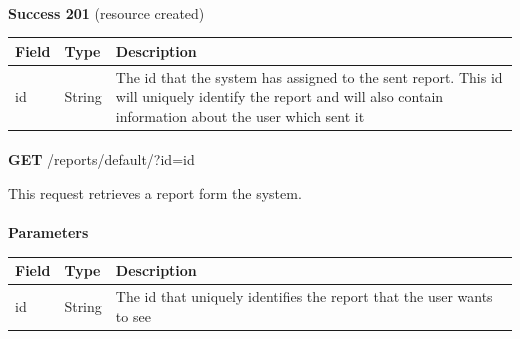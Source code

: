 						\paragraph{}
							\textbf{Success 201} (resource created)
							\begin{table}[!h]
								\begin{tabular}{L{0.2\textwidth}L{0.2\textwidth}L{0.4\textwidth}}
									\toprule
									Field & Type & Description \\
									\midrule
									id & String & The id that the system has assigned to the sent report. This id will uniquely identify the report and will also contain information about the user which sent it\\
								 	\bottomrule
								\end{tabular}
							\end{table}
						
						\paragraph{}
						\textbf{GET} /reports/default/?id={id}
						
						This request retrieves a report form the system.
						\paragraph{}
							\textbf{Parameters}
							\begin{table}[!h]
								\begin{tabular}{L{0.2\textwidth}L{0.2\textwidth}L{0.4\textwidth}}
									\toprule
									Field & Type & Description \\
									\midrule
								 	id & String & The id that uniquely identifies the report that the user wants to see \\
								 	\bottomrule
								\end{tabular}
							\end{table}
